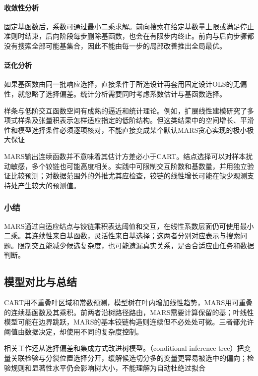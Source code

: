 \paragraph{收敛性分析}
固定基函数后，系数可通过最小二乘求解。前向搜索在给定基数量上限或满足停止准则时结束，后向阶段每步删除基函数，也会在有限步内终止。前向与后向步骤都没有搜索全部可能基集合，因此不能由每一步的局部改善推出全局最优。

\paragraph{泛化分析}
如果基函数由同一批响应选择，直接条件于所选设计再套用固定设计OLS的无偏性，就忽略了选择偏差。统计分析需要同时考虑系数估计与基函数选择。

样条与低阶交互函数空间有成熟的逼近和统计理论。例如，扩展线性建模研究了多项式样条及张量积表示怎样适应指定的低阶结构。但这类结果中的空间增长、平滑性和模型选择条件必须逐项核对，不能直接变成某个默认MARS贪心实现的极小极大保证

MARS输出连续函数并不意味着其估计方差必小于CART。结点选择可以对样本扰动敏感，多个铰链也可能高度相关。实践中可限制交互阶数和基数量，并用独立验证比较预测；对数据范围外的外推尤其应检查，铰链的线性增长可能在缺少观测支持处产生较大的预测值。

\subsubsection{小结}

MARS通过自适应结点与铰链乘积表达阈值和交互，在线性系数层面仍可使用最小二乘。其连续性来自基函数，灵活性来自基选择；这两者分别对应表示与搜索问题。限制交互能减少候选复杂度，也可能遗漏真实关系，是否合适应由任务和数据判断。

\subsection{模型对比与总结}

CART用不重叠叶区域和常数预测，模型树在叶内增加线性趋势，MARS用可重叠的连续基函数及其乘积。前两者沿树路径路由，MARS需要计算保留的基；叶线性模型可能在边界跳跃，MARS的基本铰链构造则连续但不必处处可微。三者都允许阈值由数据决定，却使用不同的复杂度控制。

相关工作还从选择偏差和集成方式改进树模型。（conditional inference tree）把变量关联检验与分裂位置选择分开，缓解候选切分多的变量更容易被选中的偏向；检验规则和显著性水平仍会影响树大小，不能理解为自动杜绝过拟合

